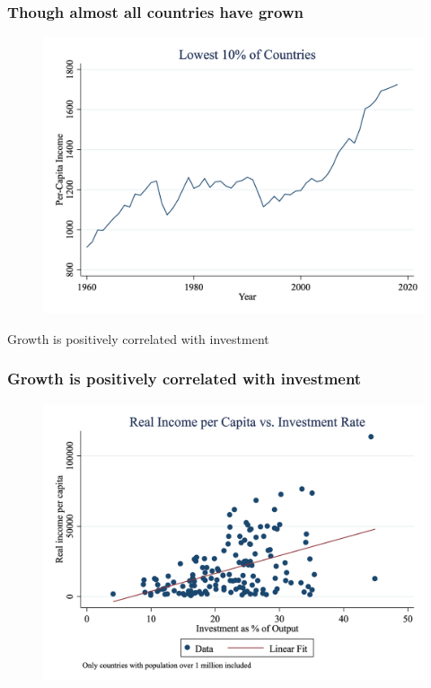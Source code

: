 \documentclass{beamer}
\begin{document}
\begin{frame}
\frametitle[alignment=center]{Though almost all countries have grown}
\begin{figure}
\centering
\includegraphics[scale=0.25]{Figures/Fig_7pt0c.png}
\end{figure}
Growth is positively correlated with investment
\end{frame}


\begin{frame}
\frametitle[alignment=center]{Growth is positively correlated with investment}
\begin{figure}
\centering
\includegraphics[scale=0.25]{Figures/Fig_7pt1.png}
\end{figure}

\end{frame}
\end{document}
